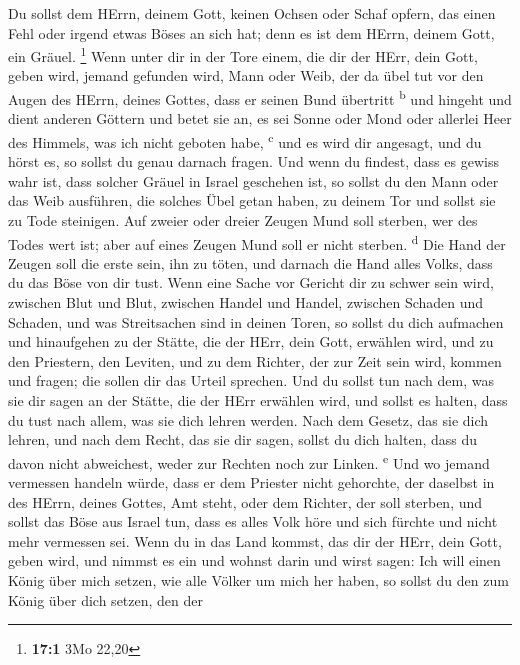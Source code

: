  Du sollst dem HErrn, deinem Gott, keinen Ochsen oder
Schaf opfern, das einen Fehl oder irgend etwas Böses an sich hat; denn
es ist dem HErrn, deinem Gott, ein Gräuel. \footnote{\textbf{17:1} 3Mo
  22,20}  Wenn unter dir in der Tore einem, die dir der
HErr, dein Gott, geben wird, jemand gefunden wird, Mann oder Weib, der
da übel tut vor den Augen des HErrn, deines Gottes, dass er seinen Bund
übertritt \textsuperscript{b}  und hingeht und dient
anderen Göttern und betet sie an, es sei Sonne oder Mond oder allerlei
Heer des Himmels, was ich nicht geboten habe, \textsuperscript{c}
 und es wird dir angesagt, und du hörst es, so sollst du
genau darnach fragen. Und wenn du findest, dass es gewiss wahr ist, dass
solcher Gräuel in Israel geschehen ist,  so sollst du den
Mann oder das Weib ausführen, die solches Übel getan haben, zu deinem
Tor und sollst sie zu Tode steinigen.  Auf zweier oder
dreier Zeugen Mund soll sterben, wer des Todes wert ist; aber auf eines
Zeugen Mund soll er nicht sterben. \textsuperscript{d} 
Die Hand der Zeugen soll die erste sein, ihn zu töten, und darnach die
Hand alles Volks, dass du das Böse von dir tust.  Wenn
eine Sache vor Gericht dir zu schwer sein wird, zwischen Blut und Blut,
zwischen Handel und Handel, zwischen Schaden und Schaden, und was
Streitsachen sind in deinen Toren, so sollst du dich aufmachen und
hinaufgehen zu der Stätte, die der HErr, dein Gott, erwählen wird,
 und zu den Priestern, den Leviten, und zu dem Richter,
der zur Zeit sein wird, kommen und fragen; die sollen dir das Urteil
sprechen.  Und du sollst tun nach dem, was sie dir sagen
an der Stätte, die der HErr erwählen wird, und sollst es halten, dass du
tust nach allem, was sie dich lehren werden.  Nach dem
Gesetz, das sie dich lehren, und nach dem Recht, das sie dir sagen,
sollst du dich halten, dass du davon nicht abweichest, weder zur Rechten
noch zur Linken. \textsuperscript{e}  Und wo jemand
vermessen handeln würde, dass er dem Priester nicht gehorchte, der
daselbst in des HErrn, deines Gottes, Amt steht, oder dem Richter, der
soll sterben, und sollst das Böse aus Israel tun,  dass
es alles Volk höre und sich fürchte und nicht mehr vermessen sei.
 Wenn du in das Land kommst, das dir der HErr, dein Gott,
geben wird, und nimmst es ein und wohnst darin und wirst sagen: Ich will
einen König über mich setzen, wie alle Völker um mich her haben,
 so sollst du den zum König über dich setzen, den der
